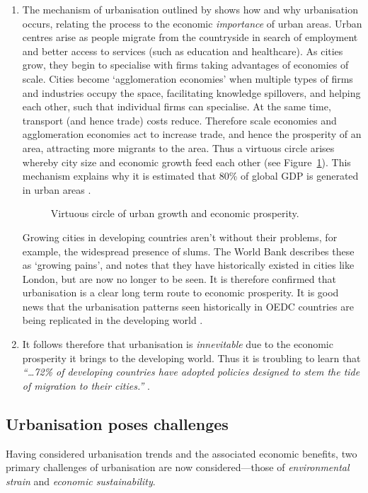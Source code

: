 \begin{enumerate}
	\item The mechanism of urbanisation outlined by \citet{WorldBank2008a} shows how and why urbanisation occurs, relating the process to the economic \emph{importance} of urban areas. Urban centres arise as people migrate from the countryside in search of employment and better access to services (such as education and healthcare). As cities grow, they begin to specialise with firms taking advantages of economies of scale. Cities become `agglomeration economies' when multiple types of firms and industries occupy the space, facilitating knowledge spillovers, and helping each other, such that individual firms can specialise. At the same time, transport (and hence trade) costs reduce. Therefore scale economies and agglomeration economies act to increase trade, and hence the prosperity of an area, attracting more migrants to the area. Thus a virtuous circle arises whereby city size and economic growth feed each other (see Figure~\ref{fig:urbanCycle}). This mechanism explains why it is estimated that 80\% of global GDP is generated in urban areas \citep{AREAS2012}.

\begin{figure}[h]
	\centering
	
	\caption{Virtuous circle of urban growth and economic prosperity.} \label{fig:urbanCycle}
\end{figure}
Growing cities in developing countries aren't without their problems, for example, the widespread presence of slums. The World Bank describes these as `growing pains', and notes that they have historically existed in cities like London, but are now no longer to be seen. It is therefore confirmed that urbanisation is a clear long term route to economic prosperity. It is good news that the urbanisation patterns seen historically in OEDC countries are being replicated in the developing world \citep{WorldBank2008a}. 

	\item It follows therefore that urbanisation is \emph{innevitable} due to the economic prosperity it brings to the developing world. Thus it is troubling to learn that \emph{``\ldots 72\% of developing countries have adopted policies designed to stem the tide of migration to their cities.''} \citep{Donald2012}.
\end{enumerate}


\subsection{Urbanisation poses challenges} \label{sec:urban_challenges}
Having considered urbanisation trends and the associated economic benefits, two primary challenges of urbanisation are now considered---those of \emph{environmental strain} and \emph{economic sustainability}.

